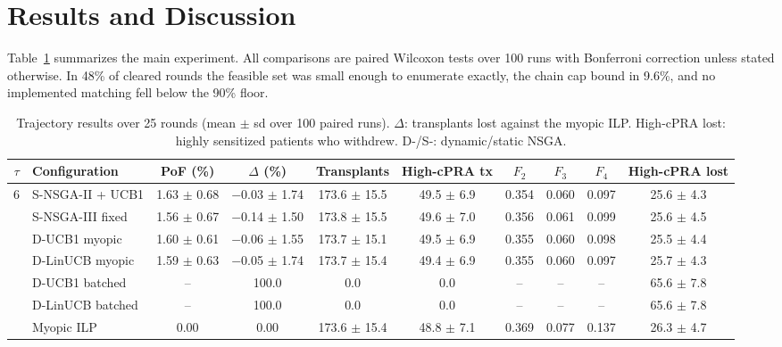 
\section{Results and Discussion}
\label{sec:results}

Table~\ref{tab:main} summarizes the main experiment. All comparisons
are paired Wilcoxon tests over 100 runs with Bonferroni correction
unless stated otherwise. In 48\% of cleared rounds the feasible set
was small enough to enumerate exactly, the chain cap bound in 9.6\%,
and no implemented matching fell below the 90\% floor.

\begin{table}[!t]
\centering
\caption{Trajectory results over 25 rounds (mean $\pm$ sd over 100
paired runs). $\Delta$: transplants lost against the myopic ILP.
High-cPRA lost: highly sensitized patients who withdrew.
D-/S-: dynamic/static NSGA.}
\label{tab:main}
\footnotesize
\setlength{\tabcolsep}{3.5pt}
\begin{tabular}{@{}cl cccccccc@{}}
\toprule
$\tau$ & Configuration & PoF (\%) & $\Delta$ (\%) & Transplants
 & High-cPRA tx & $F_2$ & $F_3$ & $F_4$ & High-cPRA lost \\
\midrule
\multirow{10}{*}{6}
 & S-NSGA-II + UCB1   & 1.63 $\pm$ 0.68 & $-$0.03 $\pm$ 1.74 & 173.6 $\pm$ 15.5 & 49.5 $\pm$ 6.9 & 0.354 & 0.060 & 0.097 & 25.6 $\pm$ 4.3 \\
 & S-NSGA-III fixed   & 1.56 $\pm$ 0.67 & $-$0.14 $\pm$ 1.50 & 173.8 $\pm$ 15.5 & 49.6 $\pm$ 7.0 & 0.356 & 0.061 & 0.099 & 25.6 $\pm$ 4.5 \\
 & D-UCB1 myopic      & 1.60 $\pm$ 0.61 & $-$0.06 $\pm$ 1.55 & 173.7 $\pm$ 15.1 & 49.5 $\pm$ 6.9 & 0.355 & 0.060 & 0.098 & 25.5 $\pm$ 4.4 \\
 & D-LinUCB myopic    & 1.59 $\pm$ 0.63 & $-$0.05 $\pm$ 1.74 & 173.7 $\pm$ 15.4 & 49.4 $\pm$ 6.9 & 0.355 & 0.060 & 0.097 & 25.7 $\pm$ 4.3 \\
 & D-UCB1 batched     & --              & 100.0              & 0.0              & 0.0            & --    & --    & --    & 65.6 $\pm$ 7.8 \\
 & D-LinUCB batched   & --              & 100.0              & 0.0              & 0.0            & --    & --    & --    & 65.6 $\pm$ 7.8 \\
 & Myopic ILP         & 0.00            & 0.00               & 173.6 $\pm$ 15.4 & 48.8 $\pm$ 7.1 & 0.369 & 0.077 & 0.137 & 26.3 $\pm$ 4.7 \\

\end{tabular}
\end{table}
